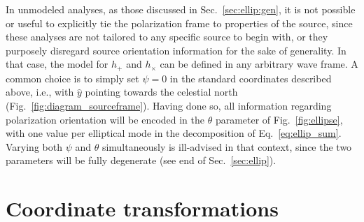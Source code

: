\documentclass[aps,prd,twocolumn,superscriptaddress,preprintnumbers,floatfix,nofootinbib]{revtex4-2}
\newcommand*{\eq}[1]{Eq.~\eqref{eq:#1}}
\begin{document}
In unmodeled analyses, as those discussed in Sec.~\ref{sec:ellip:gen}, it is not possible or useful to explicitly tie the polarization frame to properties of the source, since these analyses are not tailored to any specific source to begin with, or they purposely disregard source orientation information for the sake of generality.
In that case, the model for $h_+$ and $h_\times$ can be defined in any arbitrary wave frame.
A common choice is to simply set $\psi = 0$ in the standard coordinates described above, i.e., with $\hat{y}$ pointing towards the celestial north (Fig.~\ref{fig:diagram_sourceframe}).
Having done so, all information regarding polarization orientation will be encoded in the $\theta$ parameter of Fig.~\ref{fig:ellipse}, with one value per elliptical mode in the decomposition of \eq{ellip_sum}.
Varying both $\psi$ and $\theta$ simultaneously is ill-advised in that context, since the two parameters will be fully degenerate (see end of Sec.~\ref{sec:ellip}).

\section{Coordinate transformations}
\end{document}
